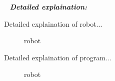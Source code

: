    \newline
  \textit{\textbf{Detailed explaination:}}
  \begin{enumerate*}
  	\item Detailed explaination of robot...
  	\begin{figure}[H]
  		\begin{minipage}[h]{1\linewidth}
  			\caption{robot}
  		\end{minipage}
  	\end{figure}
  	
  	\item Detailed explaination of program...
  	\begin{figure}[H]
  		\begin{minipage}[h]{1\linewidth}
  			\caption{robot}
  		\end{minipage}
  	\end{figure}
  	
  \end{enumerate*}
  
